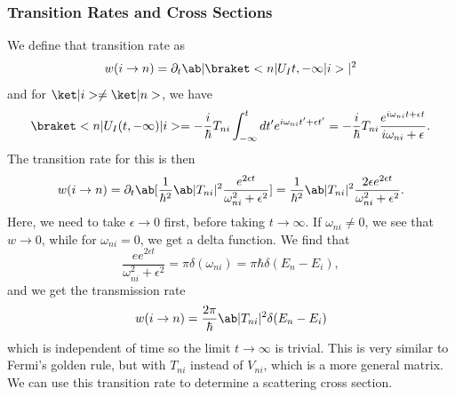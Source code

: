 \subsubsection{Transition Rates and Cross Sections}
We define that transition rate as
\begin{equation}
    w(i\to n) = \partial_t  \abs{\bkop{n}{U_I{t,-\infty}}{i}}^2
\end{equation}
and for $\k{i} \neq \k{n}$, we have
\begin{equation}
    \bkop{n}{U_I(t,-\infty)}{i} = - \frac{i}{\hbar} T_{ni} \int_{-\infty}^{t} dt' e^{i\omega_{ni} t' + \epsilon t'} = -\frac{i}{\hbar} T_{ni} \frac{e^{i\omega_{ni} t + \epsilon t}}{i \omega_{ni} + \epsilon}.
\end{equation}
The transition rate for this is then
\begin{equation}
    w(i \to n) = \partial_t \ab [\frac{1}{\hbar^2} \abs{T_{ni}}^2 \frac{e^{2\epsilon t}}{\omega_{ni}^2 + \epsilon^2} ] = \frac{1}{\hbar^2} \abs{T_{ni}}^2 \frac{2\epsilon e^{2\epsilon t}}{\omega_{ni}^2 + \epsilon^2}.
\end{equation}
Here, we need to take $\epsilon \to 0$ first, before taking $t \to \infty$. If $\omega_{ni}\neq 0$, we see that $w \to 0$, while for $\omega_{ni} = 0$, we get a delta function. We find that 
\begin{equation}
    \frac{e e^{2\epsilon t}}{\omega_{ni}^2 + \epsilon^2} = \pi \delta(\omega_{ni}) = \pi \hbar \delta(E_n - E_i),
\end{equation}
and we get the transmission rate
\begin{equation}
    w(i \to n) = \frac{2\pi}{\hbar} \abs{T_{ni}}^2 \delta(E_n - E_i)
\end{equation}
which is independent of time so the limit $t\to\infty$ is trivial. This is very similar to Fermi's golden rule, but with $T_{ni}$ instead of $V_{ni}$, which is a more general matrix. We can use this transition rate to determine a scattering cross section.

